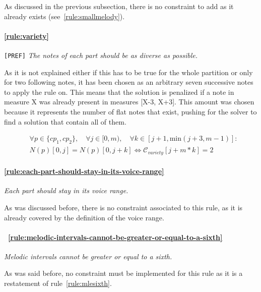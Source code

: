 As discussed in the previous subsection, there is no constraint to add as it already exists (see~\ref{rule:smallmelody}).

\paragraph{\hspace{.6cm}\ref{rule:variety}} \texttt{[PREF]}  \textit{The notes of each part should be as diverse as possible.}

    As it is not explained either if this has to be true for the whole partition or only for two following notes, it has been chosen as an arbitrary seven successive notes to apply the rule on. This means that the solution is penalized if a note in measure X was already present in measures [X-3, X+3]. This amount was chosen because it represents the number of flat notes that exist, pushing for the solver to find a solution that contain all of them.

    \begin{equation} \begin{aligned}
    &\forall p \in \{cp_1, cp_2\}, \quad \forall j \in [0, m), \quad \forall k \in [j+1, \text{min} (j+3, m-1)] :\\ 
    &N(p)[0, j] = N(p)[0, j+k]\iff \mathcal{C}_{variety}[j+m*k]= 2
    \end{aligned} \end{equation}

    \paragraph{\hspace{.6cm}\ref{rule:each-part-should-stay-in-its-voice-range}}  \textit{Each part should stay in its voice range.}

    As was discussed before, there is no constraint associated to this rule, as it is already covered by the definition of the voice range.

    \paragraph{\hspace{0.6cm}~\ref{rule:melodic-intervals-cannot-be-greater-or-equal-to-a-sixth}}  \textit{Melodic intervals cannot be greater or equal to a sixth.}

    As was said before, no constraint must be implemented for this rule as it is a restatement of rule~\ref{rule:mlesixth}.

